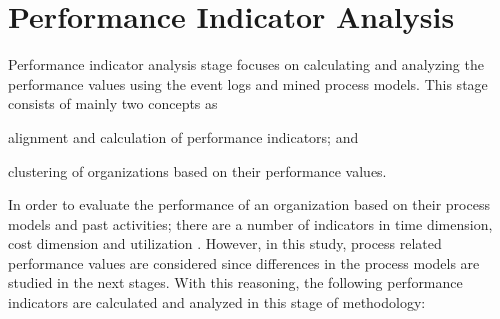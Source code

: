 \section{Performance Indicator Analysis}
\label{sec:performance-indicator-analysis}
Performance indicator analysis stage focuses on calculating and analyzing the performance values using the event logs and mined process models. This stage consists of mainly two concepts as 
\begin{inparaenum}
\item alignment and calculation of performance indicators; and
\item clustering of organizations based on their performance values.
\end{inparaenum}
In order to evaluate the performance of an organization based on their process models and past activities; there are a number of indicators in time dimension, cost dimension and utilization \cite{van2011process}. However, in this study, process related performance values are considered since differences in the process models are studied in the next stages. With this reasoning, the following performance indicators are calculated and analyzed in this stage of methodology:
